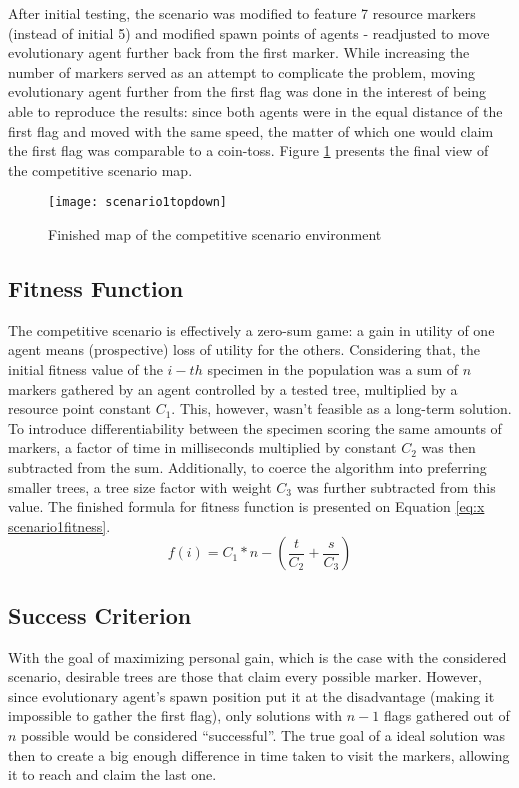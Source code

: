 After initial testing, the scenario was modified to feature 7 resource markers (instead of initial 5) and modified spawn points of agents -  readjusted to move evolutionary agent further back from the first marker. While increasing the number of markers served as an attempt to complicate the problem, moving evolutionary agent further from the first flag was done in the interest of being able to reproduce the results: since both agents were in the equal distance of the first flag and moved with the same speed, the matter of which one would claim the first flag was comparable to a coin-toss. Figure \ref{fig:x scenario1topdown} presents the final view of the competitive scenario map.

\begin{figure}[h]
    \centering
    \texttt{[image: scenario1topdown]}
    \caption{Finished map of the competitive scenario environment}
    \label{fig:x scenario1topdown}
\end{figure}

\subsection{Fitness Function}
The competitive scenario is effectively a zero-sum game: a gain in utility of one agent means (prospective) loss of utility for the others. Considering that, the initial fitness value of the $i-th$ specimen in the population was a sum of $n$ markers gathered by an agent controlled by a tested tree, multiplied by a resource point constant $C_1$. This, however, wasn't feasible as a long-term solution. To introduce differentiability between the specimen scoring the same amounts of markers, a  factor of time in milliseconds multiplied by constant $C_2$ was then subtracted from the sum. Additionally, to coerce the algorithm into preferring smaller trees, a tree size factor with weight $C_3$ was further subtracted from this value. The finished formula for fitness function is presented on Equation \ref{eq:x scenario1fitness}.
\begin{equation}
    \label{eq:x scenario1fitness}
f(i) = C_1 * n - (\frac{t}{C_2} + \frac{s}{C_3})
\end{equation}
\subsection{Success Criterion}
\label{section_competitive_success}
With the goal of maximizing personal gain, which is the case with the considered scenario, desirable trees are those that claim every possible marker. However, since evolutionary agent's spawn position put it at the disadvantage (making it impossible to gather the first flag), only solutions with $n - 1$ flags gathered out of $n$ possible would be considered ``successful''. The true goal of a ideal solution was then to create a big enough difference in time taken to visit the markers, allowing it to reach and claim the last one.
